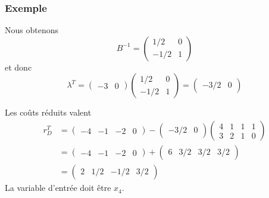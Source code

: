 \documentclass[usepdftitle=false]{beamer}
\begin{document}
\begin{frame}
\frametitle{Exemple}

Nous obtenons
\[
B^{-1} =
\begin{pmatrix}
1/2 & 0 \\
-1/2 & 1
\end{pmatrix}
\]
et donc
\[
\lambda^T = \begin{pmatrix} -3 & 0 \end{pmatrix}
\begin{pmatrix}
1/2 & 0 \\
-1/2 & 1
\end{pmatrix} =  
\begin{pmatrix} -3/2 & 0 \end{pmatrix}
\]

Les coûts réduits valent
\begin{align*}
r_D^T &=
\begin{pmatrix}
-4 & -1 & -2 & 0
\end{pmatrix}
-
\begin{pmatrix}
-3/2 & 0
\end{pmatrix}
\begin{pmatrix}
4 & 1 & 1 & 1 \\
3 & 2 & 1 & 0
\end{pmatrix} \\
&=
\begin{pmatrix}
-4 & -1 & -2 & 0
\end{pmatrix} +
\begin{pmatrix}
6 & 3/2 & 3/2 & 3/2
\end{pmatrix} \\
&=
\begin{pmatrix}
2 & 1/2 & -1/2 & 3/2
\end{pmatrix}
\end{align*}
La variable d'entrée doit être $x_4$.

\end{frame}
\end{document}
